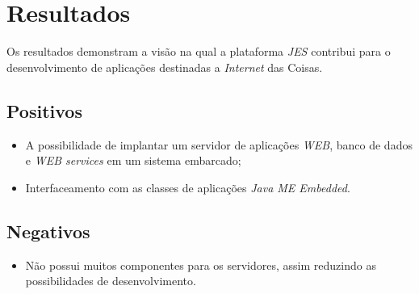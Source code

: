 \section{Resultados}

Os resultados demonstram a visão na qual a plataforma \textit{JES} contribui
para o desenvolvimento de aplicações destinadas a \textit{Internet} das Coisas.

\subsection{Positivos}

\begin{itemize}

    \item A possibilidade de implantar um servidor de aplicações \textit{WEB},
    banco de dados e \textit{WEB services} em um sistema embarcado;

    \item Interfaceamento com as classes de aplicações \textit{Java ME
    Embedded}.

\end{itemize}

\subsection{Negativos}

\begin{itemize}

    \item Não possui muitos componentes para os servidores, assim reduzindo as
    possibilidades de desenvolvimento.

\end{itemize}
